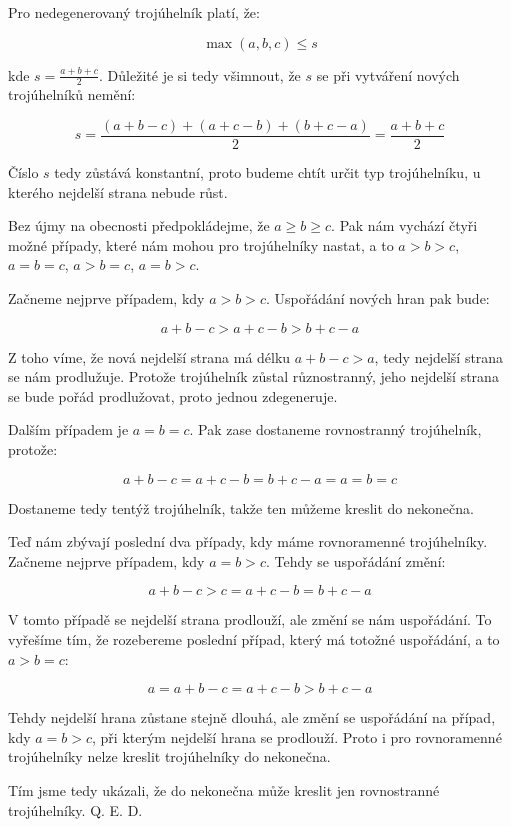 \documentclass{fkssolpub}
\author{Ondřej Sedláček}
\begin{document}
Pro nedegenerovaný trojúhelník platí, že:

\[
	\max(a,b,c) \leq s
\]

kde $s = \frac{a + b + c}{2}$. Důležité je si tedy všimnout, že $s$ se při vytváření nových trojúhelníků nemění:

\[
	s = \frac{(a + b - c) + (a + c - b) + (b + c - a)}{2} = \frac{a + b + c}{2}
\]

Číslo $s$ tedy zůstává konstantní, proto budeme chtít určit typ trojúhelníku, u kterého nejdelší strana nebude růst.

Bez újmy na obecnosti předpokládejme, že $a \geq b \geq c$. Pak nám vychází čtyři možné případy, které nám mohou pro trojúhelníky nastat, a to $a > b > c$, $a = b = c$, $a > b = c$, $a = b > c$.

Začneme nejprve případem, kdy $a > b > c$. Uspořádání nových hran pak bude:

\[
	a + b - c > a + c - b > b + c - a
\]

Z toho víme, že nová nejdelší strana má délku $a + b - c > a$, tedy nejdelší strana se nám prodlužuje. Protože trojúhelník zůstal různostranný, jeho nejdelší strana se bude pořád prodlužovat, proto jednou zdegeneruje.

Dalším případem je $a = b = c$. Pak zase dostaneme rovnostranný trojúhelník, protože:

\[
	a + b - c = a + c - b = b + c - a = a = b = c
\]

Dostaneme tedy tentýž trojúhelník, takže ten můžeme kreslit do nekonečna.

Teď nám zbývají poslední dva případy, kdy máme rovnoramenné trojúhelníky. Začneme nejprve případem, kdy $a = b > c$. Tehdy se uspořádání změní:

\[
	a + b - c > c = a + c - b = b + c - a
\]

V tomto případě se nejdelší strana prodlouží, ale změní se nám uspořádání. To vyřešíme tím, že rozebereme poslední případ, který má totožné uspořádání, a to $a > b = c$:

\[
	a = a + b - c = a + c - b > b + c - a
\]

Tehdy nejdelší hrana zůstane stejně dlouhá, ale změní se uspořádání na případ, kdy $a = b > c$, při kterým nejdelší hrana se prodlouží. Proto i pro rovnoramenné trojúhelníky nelze kreslit trojúhelníky do nekonečna.

Tím jsme tedy ukázali, že do nekonečna může kreslit jen rovnostranné trojúhelníky. Q. E. D.
\end{document}
